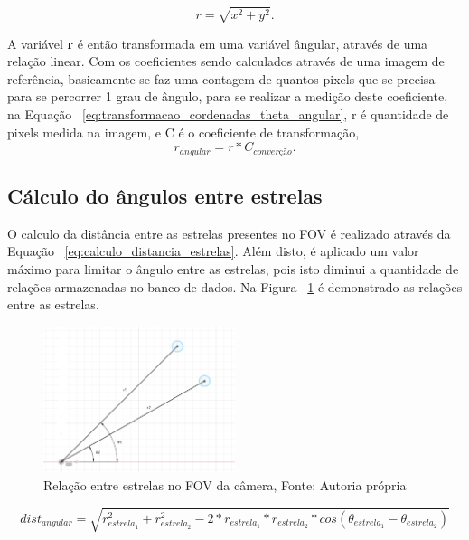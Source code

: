 \begin{equation}
	r = \sqrt{x^2 + y^2}.
	\label{eq:transformacao_cordenadas_r}
\end{equation}

A variável \textbf{r} é então transformada em uma variável ângular, através de uma relação linear. 
Com os coeficientes sendo calculados através de uma imagem de referência, 
basicamente se faz uma contagem de quantos pixels que se precisa para se percorrer 1 grau de ângulo, para se realizar a medição deste coeficiente,
na Equação ~\ref{eq:transformacao_cordenadas_theta_angular}, r é quantidade de pixels medida na imagem, e C é o coeficiente de transformação, 
\begin{equation}
	r_{angular} = r * C_{converção}.
	\label{eq:transformacao_cordenadas_theta_angular}
\end{equation}

\subsection{Cálculo do ângulos entre estrelas}
\label{subsec:calculo_angulos_entre_estrelas}

O calculo da distância entre as estrelas presentes no FOV é realizado através da Equação ~\ref{eq:calculo_distancia_estrelas}.
Além disto, é aplicado um valor máximo para limitar o ângulo entre as estrelas, pois isto diminui a quantidade de relações armazenadas no banco de dados.
Na Figura ~\ref{fig:angulo_entre_estrelas} é demonstrado as relações entre as estrelas.

\begin{figure}[H]
	\centering
	\includegraphics[width=0.5\textwidth]{images/relacoes_entre_estrelas.png}
	\caption{Relação entre estrelas no FOV da câmera, Fonte: Autoria própria}
	\label{fig:angulo_entre_estrelas}
\end{figure}

\begin{equation}
	dist_{angular} = \sqrt{r_{estrela_1}^2 + r_{estrela_2}^2 - 2 * r_{estrela_1} * r_{estrela_2} * cos(\theta_{estrela_1} - \theta_{estrela_2})}
	\label{eq:calculo_distancia_estrelas}
\end{equation}

